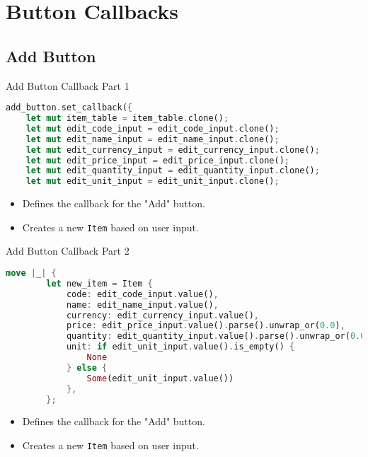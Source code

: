\documentclass[aspectratio=169, table]{beamer}
\begin{document}
\section{Button Callbacks}
\subsection{Add Button}
\begin{frame}[fragile]{Add Button Callback Part 1}
\begin{lstlisting}[language=Rust]
add_button.set_callback({
	let mut item_table = item_table.clone();
	let mut edit_code_input = edit_code_input.clone();
	let mut edit_name_input = edit_name_input.clone();
	let mut edit_currency_input = edit_currency_input.clone();
	let mut edit_price_input = edit_price_input.clone();
	let mut edit_quantity_input = edit_quantity_input.clone();
	let mut edit_unit_input = edit_unit_input.clone();
\end{lstlisting}

\begin{itemize}
	\item Defines the callback for the "Add" button.
	\item Creates a new \texttt{Item} based on user input.
\end{itemize}
\end{frame}

\begin{frame}[fragile]{Add Button Callback Part 2}
\vspace{15pt}
\begin{lstlisting}[language=Rust]
	move |_| {
		let new_item = Item {
			code: edit_code_input.value(),
			name: edit_name_input.value(),
			currency: edit_currency_input.value(),
			price: edit_price_input.value().parse().unwrap_or(0.0),
			quantity: edit_quantity_input.value().parse().unwrap_or(0.0),
			unit: if edit_unit_input.value().is_empty() {
				None
			} else {
				Some(edit_unit_input.value())
			},
		};
	\end{lstlisting}
	
	\begin{itemize}
		\item Defines the callback for the "Add" button.
		\item Creates a new \texttt{Item} based on user input.
	\end{itemize}
\end{frame}
\end{document}
